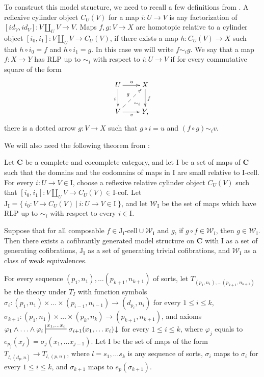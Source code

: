 \documentclass[reqno]{amsart}
\theoremstyle{definition}
\theoremstyle{remark}
\newcommand{\cat}[1]{\mathbf{#1}}
\newcommand{\C}{\cat{C}}
\newcommand{\we}{\mathcal{W}}
\newcommand{\I}{\mathrm{I}}
\newcommand{\J}{\mathrm{J}}
\newcommand{\class}[2]{#1\text{-}\mathrm{#2}}
\newcommand{\Icell}[1][\I]{\class{#1}{cell}}
\newcommand{\Icof}[1][\I]{\class{#1}{cof}}
\newcommand{\Jcell}[1][]{\Icell[\J#1]}
\newcommand{\cyli}{i}
\numberwithin{figure}{section}
\begin{document}
To construct this model structure, we need to recall a few definitions from \cite{f-model-structures}.
A reflexive cylinder object $C_U(V)$ for a map $i : U \to V$ is any factorization of $[id_V,id_V] : V \amalg_U V \to V$.
Maps $f,g : V \to X$ are homotopic relative to a cylinder object $[\cyli_0,\cyli_1] : V \amalg_U V \to C_U(V)$, if there exists a map $h : C_U(V) \to X$
such that $h \circ \cyli_0 = f$ and $h \circ \cyli_1 = g$.
In this case we will write $f \sim_i g$.
We say that a map $f : X \to Y$ has RLP up to $\sim_i$ with respect to $i : U \to V$ if for every commutative square of the form
\[ \xymatrix{ U \ar[r]^u \ar@{}[dr]|(.7){\sim_i} \ar[d]_i & X \ar[d]^f \\
              V \ar[r]_v \ar@{-->}[ur]^g                  & Y,
            } \]
there is a dotted arrow $g : V \to X$ such that $g \circ i = u$ and $(f \circ g) \sim_i v$.

We will also need the following theorem from \cite{f-model-structures}:
\begin{thm}
Let $\C$ be a complete and cocomplete category, and let $\I$ be a set of maps of $\C$
such that the domains and the codomains of maps in $\I$ are small relative to $\Icell$.
For every $i : U \to V \in \I$, choose a reflexive relative cylinder object $C_U(V)$
such that $[\cyli_0,\cyli_1] : V \amalg_U V \to C_U(V) \in \Icof$.
Let $\J_\I = \{\ \cyli_0 : V \to C_U(V)\ |\ i : U \to V \in \I \ \}$, and
let $\we_\I$ be the set of maps which have RLP up to $\sim_i$ with respect to every $i \in \I$.

Suppose that for all composable $f \in \Jcell[_\I] \cup \we_\I$ and $g$, if $g \circ f \in \we_\I$, then $g \in \we_\I$.
Then there exists a cofibrantly generated model structure on $\C$ with $\I$ as a set of generating cofibrations,
$\J_\I$ as a set of generating trivial cofibrations, and $\we_\I$ as a class of weak equivalences.
\end{thm}

For every sequence $(p_1,n_1), \ldots (p_{k+1},n_{k+1})$ of sorts, let $T_{(p_1,n_1), \ldots (p_{k+1},n_{k+1})}$ be the theory under $T_I$
with function symbols $\sigma_i : (p_1,n_1) \times \ldots \times (p_{i-1},n_{i-1}) \to (d_{p_i},n_i)$ for every $1 \leq i \leq k$,
$\sigma_{k+1} : (p_1,n_1) \times \ldots \times (p_k,n_k) \to (p_{k+1},n_{k+1})$,
and axioms $\varphi_1 \land \ldots \land \varphi_i \sststile{}{x_1, \ldots x_i} \sigma_{i+1}(x_1, \ldots x_i)\!\downarrow$ for every $1 \leq i \leq k$,
where $\varphi_j$ equals to $e_{p_j}(x_j) = \sigma_j(x_1, \ldots x_{j-1})$.
Let $\I$ be the set of maps of the form $T_{l, (d_p,n)} \to T_{l, (p,n)}$, where $l = s_1, \ldots s_k$ is any sequence of sorts,
$\sigma_i$ maps to $\sigma_i$ for every $1 \leq i \leq k$, and $\sigma_{k+1}$ maps to $e_p(\sigma_{k+1})$.
\end{document}
